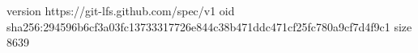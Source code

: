 version https://git-lfs.github.com/spec/v1
oid sha256:294596b6cf3a03fc13733317726e844c38b471ddc471cf25fc780a9cf7d4f9c1
size 8639
